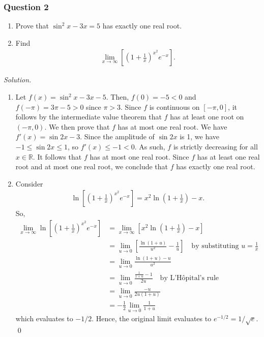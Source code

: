 \documentclass[12pt]{article}
\begin{document}
\subsubsection*{Question 2}
\begin{enumerate}[label=\textbf{(\alph*)}]
    \itemsep 0em
    \item Prove that $\operatorname{sin}^2x-3x=5$ has exactly one real root.
    \item Find \begin{align*}
        \lim_{x\rightarrow\infty}\left[\left(1+\frac{1}{x}\right)^{x^2}e^{-x}\right].
    \end{align*}
\end{enumerate}
\textit{Solution.}
\begin{enumerate}[label=\textbf{(\alph*)}]
    \itemsep 0em
    \item Let $f\left(x\right)=\operatorname{sin}^2x-3x-5$. Then, $f\left(0\right)=-5<0$ and $f\left(-\pi\right)=3\pi-5>0$ since $\pi>3$. Since $f$ is continuous on $\left[-\pi,0\right]$, it follows by the intermediate value theorem that $f$ has at least one root on $\left(-\pi,0\right)$.
    \newline
    \newline We then prove that $f$ has at most one real root. We have $f'\left(x\right)=\operatorname{sin}2x-3$. Since the amplitude of $\operatorname{sin}2x$ is 1, we have $-1\le \operatorname{sin}2x\le 1$, so $f'\left(x\right)\le -1<0$. As such, $f$ is strictly decreasing for all $x\in\mathbb{R}$. It follows that $f$ has at most one real root.
    \newline
    \newline Since $f$ has at least one real root and at most one real root, we conclude that $f$ has exactly one real root.
    \item Consider \begin{align*}
        \operatorname{ln}\left[\left(1+\frac{1}{x}\right)^{x^2}e^{-x}\right]=x^2\operatorname{ln}\left(1+\frac{1}{x}\right)-x.
    \end{align*}
    So, \begin{align*}
        \lim_{x\rightarrow \infty}\operatorname{ln}\left[\left(1+\frac{1}{x}\right)^{x^2}e^{-x}\right]&=\lim_{x\rightarrow\infty}\left[x^2\operatorname{ln}\left(1+\frac{1}{x}\right)-x\right]\\
        &=\lim_{u\rightarrow 0}\left[\frac{\operatorname{ln}\left(1+u\right)}{u^2}-\frac{1}{u}\right]\quad\text{by substituting }u=\frac{1}{x}\\
        &=\lim_{u\rightarrow 0}\frac{\operatorname{ln}\left(1+u\right)-u}{u^2}\\
        &=\lim_{u\rightarrow 0}\frac{\frac{1}{1+u}-1}{2u}\quad \text{by L'Hôpital's rule}\\
        &=\lim_{u\rightarrow 0}\frac{-u}{2u\left(1+u\right)}\\
        &=-\frac{1}{2}\lim_{u\rightarrow 0}\frac{1}{1+u}
    \end{align*}
which evaluates to $-1/2$. Hence, the original limit evaluates to $e^{-1/2}=1/\sqrt{e}$. \qed 
\end{enumerate}
\end{document}

